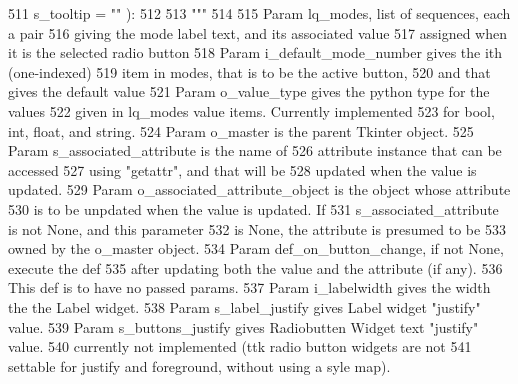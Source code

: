 \begin{DoxyCode}
511             s\_tooltip = \textcolor{stringliteral}{""} ):
512 
513         \textcolor{stringliteral}{"""}
514 \textcolor{stringliteral}{        }
515 \textcolor{stringliteral}{        Param lq\_modes, list of sequences, each a pair}
516 \textcolor{stringliteral}{            giving the mode label text, and its associated value}
517 \textcolor{stringliteral}{            assigned when it is the selected radio button}
518 \textcolor{stringliteral}{        Param i\_default\_mode\_number gives the ith (one-indexed)}
519 \textcolor{stringliteral}{            item in modes, that is to be the active button,}
520 \textcolor{stringliteral}{            and that gives the default value}
521 \textcolor{stringliteral}{        Param o\_value\_type gives the python type for the values}
522 \textcolor{stringliteral}{            given in lq\_modes value items.  Currently implemented}
523 \textcolor{stringliteral}{            for bool, int, float, and string.}
524 \textcolor{stringliteral}{        Param o\_master is the parent Tkinter object.}
525 \textcolor{stringliteral}{                Param s\_associated\_attribute is the name of }
526 \textcolor{stringliteral}{            attribute instance that can be accessed}
527 \textcolor{stringliteral}{            using "getattr", and that will be}
528 \textcolor{stringliteral}{            updated when the value is updated.}
529 \textcolor{stringliteral}{        Param o\_associated\_attribute\_object is the object whose attribute}
530 \textcolor{stringliteral}{            is to be unpdated when the value is updated.  If}
531 \textcolor{stringliteral}{            s\_associated\_attribute is not None, and this parameter}
532 \textcolor{stringliteral}{            is None, the attribute is presumed to be}
533 \textcolor{stringliteral}{            owned by the o\_master object.}
534 \textcolor{stringliteral}{        Param def\_on\_button\_change, if not None, execute the def}
535 \textcolor{stringliteral}{            after updating both the value and the attribute (if any).}
536 \textcolor{stringliteral}{            This def is to have no passed params.}
537 \textcolor{stringliteral}{        Param i\_labelwidth gives the width the the Label widget.}
538 \textcolor{stringliteral}{        Param s\_label\_justify gives Label widget "justify" value.}
539 \textcolor{stringliteral}{        Param s\_buttons\_justify gives Radiobutten Widget text "justify" value.}
540 \textcolor{stringliteral}{                currently not implemented (ttk radio button widgets are not}
541 \textcolor{stringliteral}{                settable for justify and foreground, without using a syle map).}

\end{DoxyCode}
